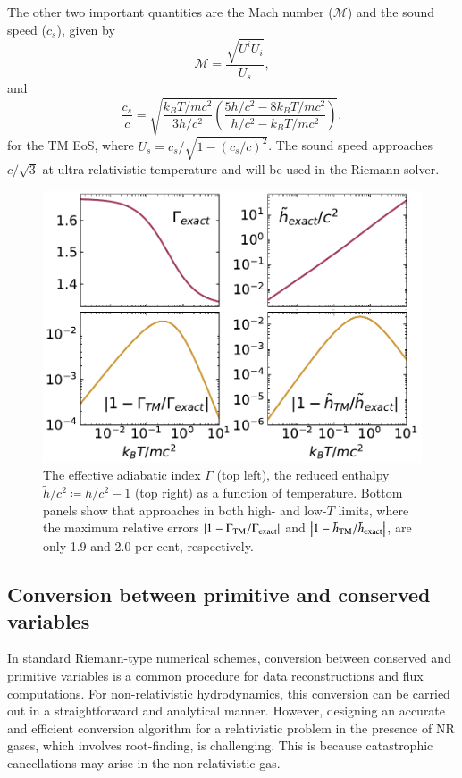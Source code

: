 \documentclass[twocolumn]{aastex63}
\begin{document}
The other two important quantities are the Mach number ($\mathscr{M}$) and the sound speed ($c_{s}$), given by
\begin{equation}
    \mathscr{M}=\frac{\sqrt{U^iU_i}}{U_{s}},
    \label{eq:MachNumber}
\end{equation}
and
\begin{equation}
\frac{c_{s}}{c} = \sqrt{\frac{k_{B}T/mc^{2}}{3h/c^2}\left(\frac{5h/c^2-8k_{B}T/mc^{2}}{h/c^2-k_{B}T/mc^{2}}\right)},
\label{sound_speed}
\end{equation}
for the TM EoS, where $U_{s}=c_{s}/\sqrt{1-\left(c_{s}/c\right)^2}$. The sound speed approaches $c/\sqrt{3}$ at ultra-relativistic temperature and will be used in the Riemann solver.


\begin{figure}
	\includegraphics[width=\columnwidth]{compare_eos.pdf}
    \caption{The effective adiabatic index $\Gamma$ (top left), the reduced enthalpy $\tilde{h}/c^2\coloneqq h/c^2-1$ (top right) as a function of temperature. Bottom panels show that  approaches  in both high- and low-$T$ limits, where the maximum relative errors $\abs{1-\Gamma_{\text{TM}}/\Gamma_{\text{exact}}}$ and $\abs{1-\tilde{h}_{\text{TM}}/\tilde{h}_{\text{exact}}}$, are only 1.9 and 2.0 per cent, respectively.}
   \label{fig:compare_eos}
\end{figure}


\subsection{Conversion between primitive and conserved variables}
\label{section: Conversion between primitive variables and conserved ones}
In standard Riemann-type numerical schemes, conversion between conserved and primitive variables is a common procedure for data reconstructions and flux computations. For non-relativistic hydrodynamics, this conversion can be carried out in a straightforward and analytical manner. However, designing an accurate and efficient conversion algorithm for a relativistic problem in the presence of NR gases, which involves root-finding, is challenging. This is because catastrophic cancellations may arise in the non-relativistic gas.
\end{document}
